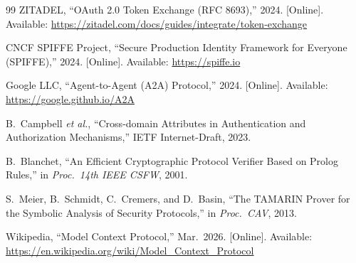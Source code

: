 \documentclass[journal]{IEEEtran}
\begin{document}
\begin{thebibliography}{99}
ZITADEL,
``OAuth 2.0 Token Exchange (RFC 8693),'' 2024.
[Online]. Available:
\url{https://zitadel.com/docs/guides/integrate/token-exchange}

CNCF SPIFFE Project,
``Secure Production Identity Framework for Everyone (SPIFFE),'' 2024.
[Online]. Available: \url{https://spiffe.io}

Google LLC, ``Agent-to-Agent (A2A) Protocol,'' 2024.
[Online]. Available: \url{https://google.github.io/A2A}

B.\ Campbell \textit{et al.},
``Cross-domain Attributes in Authentication and Authorization Mechanisms,''
IETF Internet-Draft, 2023.

B.\ Blanchet,
``An Efficient Cryptographic Protocol Verifier Based on Prolog Rules,''
in \textit{Proc.\ 14th IEEE CSFW}, 2001.

S.\ Meier, B.\ Schmidt, C.\ Cremers, and D.\ Basin,
``The TAMARIN Prover for the Symbolic Analysis of Security Protocols,''
in \textit{Proc.\ CAV}, 2013.

Wikipedia,
``Model Context Protocol,'' Mar.\ 2026.
[Online]. Available:
\url{https://en.wikipedia.org/wiki/Model_Context_Protocol}

\end{thebibliography}
\end{document}
